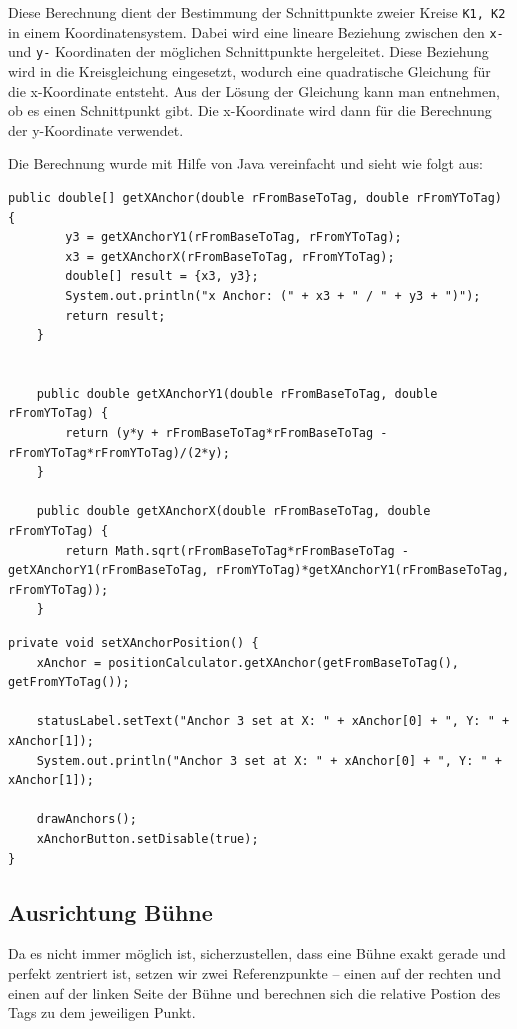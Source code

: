 Diese Berechnung dient der Bestimmung der Schnittpunkte zweier Kreise \texttt{K1, K2} in einem Koordinatensystem. Dabei wird eine lineare Beziehung zwischen den \texttt{x- } und \texttt{y-} Koordinaten der möglichen Schnittpunkte hergeleitet. Diese Beziehung wird in die Kreisgleichung eingesetzt, wodurch eine quadratische Gleichung für die x-Koordinate entsteht. Aus der Lösung der Gleichung kann man entnehmen, ob es einen Schnittpunkt gibt. Die x-Koordinate wird dann für die Berechnung der y-Koordinate verwendet.
\newpage

Die Berechnung wurde mit Hilfe von Java vereinfacht und sieht wie folgt aus:
\begin{lstlisting}[style=Java, caption=Auszug aus PositionCalculator.java, captionpos=b]
	 public double[] getXAnchor(double rFromBaseToTag, double rFromYToTag) {
		y3 = getXAnchorY1(rFromBaseToTag, rFromYToTag);
		x3 = getXAnchorX(rFromBaseToTag, rFromYToTag);
		double[] result = {x3, y3};
		System.out.println("x Anchor: (" + x3 + " / " + y3 + ")");
		return result;
	}
	
	
	public double getXAnchorY1(double rFromBaseToTag, double rFromYToTag) {
		return (y*y + rFromBaseToTag*rFromBaseToTag - rFromYToTag*rFromYToTag)/(2*y);
	}
	
	public double getXAnchorX(double rFromBaseToTag, double rFromYToTag) {
		return Math.sqrt(rFromBaseToTag*rFromBaseToTag - getXAnchorY1(rFromBaseToTag, rFromYToTag)*getXAnchorY1(rFromBaseToTag, rFromYToTag));
	}
\end{lstlisting}

\begin{lstlisting}[style=Java, caption=xAnchor Berechnung, captionpos=b]
	private void setXAnchorPosition() {
	xAnchor = positionCalculator.getXAnchor(getFromBaseToTag(), getFromYToTag());
	
	statusLabel.setText("Anchor 3 set at X: " + xAnchor[0] + ", Y: " + xAnchor[1]);
	System.out.println("Anchor 3 set at X: " + xAnchor[0] + ", Y: " + xAnchor[1]);
	
	drawAnchors();
	xAnchorButton.setDisable(true);
}
\end{lstlisting}
\newpage
\subsection{Ausrichtung Bühne}
Da es nicht immer möglich ist, sicherzustellen, dass eine Bühne exakt gerade und perfekt zentriert ist, setzen wir zwei Referenzpunkte – einen auf der rechten und einen auf der linken Seite der Bühne und berechnen sich die relative Postion des Tags zu dem jeweiligen Punkt.  

